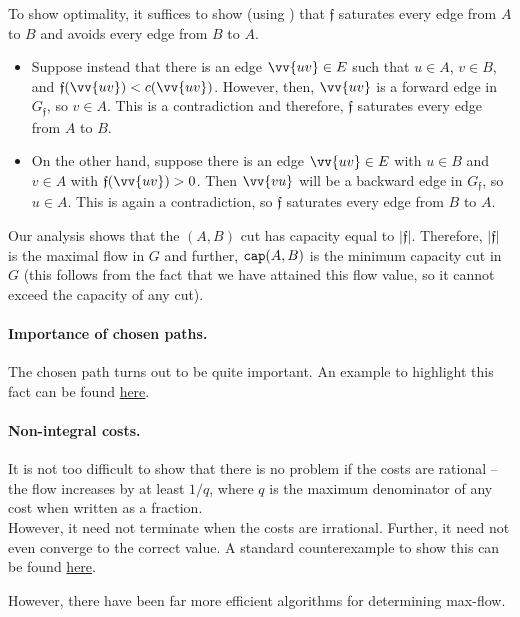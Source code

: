To show optimality, it suffices to show (using ) that $\mathfrak{f}$ saturates every edge from $A$ to $B$ and avoids every edge from $B$ to $A$.
\begin{itemize}
	\item Suppose instead that there is an edge $\vv{uv}\in E$ such that $u\in A$, $v\in B$, and $\mathfrak{f}(\vv{uv}) < c(\vv{uv})$. However, then, $\vv{uv}$ is a forward edge in $G_\mathfrak{f}$, so $v\in A$. This is a contradiction and therefore, $\mathfrak{f}$ saturates every edge from $A$ to $B$.
	\item On the other hand, suppose there is an edge $\vv{uv}\in E$ with $u\in B$ and $v\in A$ with $\mathfrak{f}(\vv{uv})>0$. Then $\vv{vu}$ will be a backward edge in $G_\mathfrak{f}$, so $u\in A$. This is again a contradiction, so $\mathfrak{f}$ saturates every edge from $B$ to $A$.
\end{itemize}

Our analysis shows that the $(A,B)$ cut has capacity equal to $|\mathfrak{f}|$. Therefore, $|\mathfrak{f}|$ is the maximal flow in $G$ and further, $\texttt{cap}(A,B)$ is the minimum capacity cut in $G$ (this follows from the fact that we have attained this flow value, so it cannot exceed the capacity of any cut).

\paragraph{Importance of chosen paths.} The chosen path turns out to be quite important. An example to highlight this fact can be found \href{https://en.wikipedia.org/wiki/Ford%E2%80%93Fulkerson_algorithm#Integral_example}{here}.

\paragraph{Non-integral costs.} It is not too difficult to show that there is no problem if the costs are rational -- the flow increases by at least $1/q$, where $q$ is the maximum denominator of any cost when written as a fraction.\\
However, it need not terminate when the costs are irrational. Further, it need not even converge to the correct value. A standard counterexample to show this can be found \href{https://en.wikipedia.org/wiki/Ford%E2%80%93Fulkerson_algorithm#Non-terminating_example}{here}.

However, there have been far more efficient algorithms for determining max-flow.

